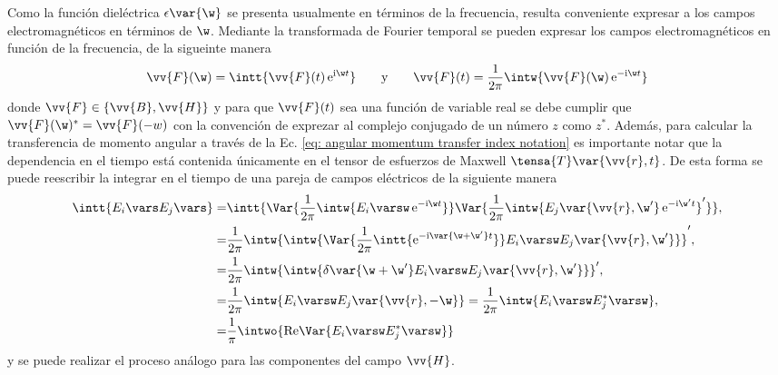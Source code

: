 Como la función dieléctrica $\epsilon\var{\w}$ se presenta usualmente en términos de la frecuencia, resulta conveniente expresar a los campos electromagnéticos en términos de $\w$. Mediante la transformada de Fourier temporal se pueden expresar los campos electromagnéticos en función de la frecuencia, de la sigueinte manera
\begin{equation}
\vv{F}(\w) = \intt{\vv{F}(t)\,{\rm e}^{{\rm i} \w t}} \qquad \text{y} \qquad \vv{F}(t) = \frac{1}{2\pi}\intw{\vv{F}(\w)\,{\rm e}^{-{\rm i} \w t}}
\end{equation}
donde $\vv{F}\in \{ \vv{B}, \vv{H}\}$ y para que $\vv{F}(t)$ sea una función de variable real se debe cumplir que $\vv{F}(\w)^{*}=\vv{F}(-w)$ con la convención de exprezar al complejo conjugado de un número $z$ como $z^{*}$. Además, para calcular la transferencia de momento angular a través de la Ec. \eqref{eq: angular momentum transfer index notation} es importante notar que la dependencia en el tiempo está contenida únicamente en el tensor de esfuerzos de Maxwell $\tensa{T}\var{\vv{r},t}$. De esta forma se puede reescribir la integrar en el tiempo de una pareja de campos eléctricos de la siguiente manera
\begin{align}
\intt{E_i\vars E_j \vars} =& \intt{\Var{\frac{1}{2\pi}\intw{E_i\varsw \,{\rm e}^{-{\rm i} \w t} }} \Var{\frac{1}{2\pi}\intw{E_j\var{\vv{r},\w^{\prime}} \,{\rm e}^{-{\rm i} \w^{\prime} t} }^{\prime}} },\nonumber\\
=&\frac{1}{2\pi} \intw{\intw{\Var{\frac{1}{2\pi}\intt{{\rm e}^{-{\rm i}\var{\w+\w^{\prime}} t}}} E_i \varsw E_j\var{\vv{r},\w^{\prime}}}}^{\prime},\nonumber\\
=&\frac{1}{2\pi}\intw{\intw{\delta\var{\w+\w^{\prime}} E_i \varsw E_j\var{\vv{r},\w^{\prime}} }}^{\prime},\nonumber\\
=&\frac{1}{2\pi}\intw{ E_i \varsw E_j\var{\vv{r},-\w} }=\frac{1}{2\pi}\intw{ E_i \varsw E_j^{*}\varsw },\nonumber\\
=&\frac{1}{\pi}\intwo{{\rm Re}\Var{E_i\varsw E_j^{*}\varsw}}
\end{align}
y se puede realizar el proceso análogo para las componentes del campo $\vv{H}$.

